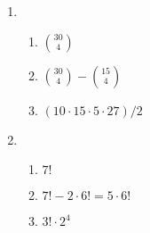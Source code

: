 {\begin{enumerate}
\begin{enumerate}
\item $P(80,10)=80!/70!$
\item ${10 + (4-1) \choose 10} = {13 \choose 10}$
\item ${6 + (4-1) \choose 6} = {9 \choose 6}$
\end{enumerate}
\item
\begin{enumerate} \item $30 \choose 4$
\item ${30 \choose 4}-{15 \choose 4}$
\item $(10 \cdot 15 \cdot 5 \cdot 27)/2$ \end{enumerate}
\item \begin{enumerate}
\item $7!$
\item $7!-2\cdot 6!=5\cdot 6!$
\item $3! \cdot 2^4$\end{enumerate}

\end{enumerate}
}

